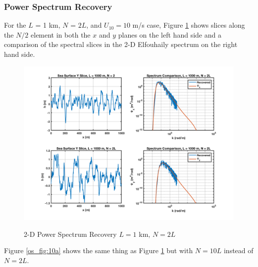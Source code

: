\subsubsection {Power Spectrum Recovery}
For the $L$ = 1 km, $N$ = $2L$, and $U_{10} = 10$ m/s case, Figure \ref{os_fig:10} shows slices along the $N/2$ element in both the $x$ and $y$ planes on the left hand side and a comparison of the spectral slices in the 2-D Elfouhaily spectrum on the right hand side. 

\begin{figure}[ht]
  \begin{center}
\includegraphics[width=6in]{../media/Ocean_Surface/sea_surface_2d_slices_1000.png}
  \end{center}
  \renewcommand{\baselinestretch}{1} \small\normalsize
  \begin{quote}
    \caption[2-D Power Spectrum Recovery $L = 1$ km, $N = 2L$]{2-D Power Spectrum Recovery $L = 1$ km, $N = 2L$\label{os_fig:10}}
  \end{quote}
\end{figure}
\renewcommand{\baselinestretch}{2} \small\normalsize

Figure \ref{os_fig:10a} shows the same thing as Figure \ref{os_fig:10} but with $N=10L$ instead of $N = 2L$.

